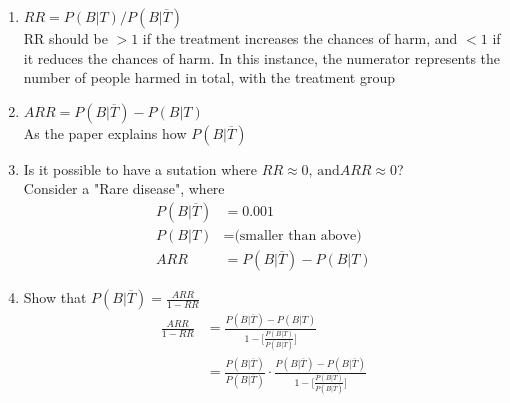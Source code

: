 \documentclass{article}
\begin{document}
\begin{enumerate}[label=\alph*)]
    \item \(RR = P(B \vert T) / P(B \vert \overline{T})\) \\
          RR should be \(> 1\) if the treatment increases the chances of harm, and \(< 1\) if it reduces the chances of harm.
          In this instance, the numerator represents the number of people harmed in total, with the treatment group
    \item \(ARR = P(B \vert \overline{T}) - P(B \vert T)\) \\
          As the paper explains how \(P(B \vert \overline{T})\)
    \item Is it possible to have a sutation where \(RR \approx 0 \text{, and} ARR \approx 0\)? \\
          Consider a "Rare disease", where
          \begin{align*}
              P(B \vert \overline{T}) & = 0.001                                  \\
              P(B \vert T)            & = \text{(smaller than above)}            \\
              ARR                     & = P(B \vert \overline{T}) - P(B \vert T)
          \end{align*}
    \item Show that \(P(B \vert \overline{T}) = \frac{ARR}{1-RR}\)
          \begin{align*}
              \frac{
                  ARR
              }{
                  1-RR
              } & =
              \frac{
                  P(B \vert \overline{T}) - P(B \vert T)
              }
              {
                  1 - \lbrack
                  \frac{
                      P (B \vert T)
                  }{
                      P(B \vert \overline{T})
                  } \rbrack
              }     \\
                & =
              \frac{
                  P(B \vert \overline{T})
              }
              {
                  P(B \vert \overline{T})
              } \cdot
              \frac{
                  P(B \vert \overline{T}) - P(B \vert \overline{T})
              }
              {
                  1 - \lbrack \frac{
                      P (B \vert T)
                  }
                  {
                      P (B \vert \overline{T})
                  } \rbrack
              }
          \end{align*}
\end{enumerate}
\end{document}
